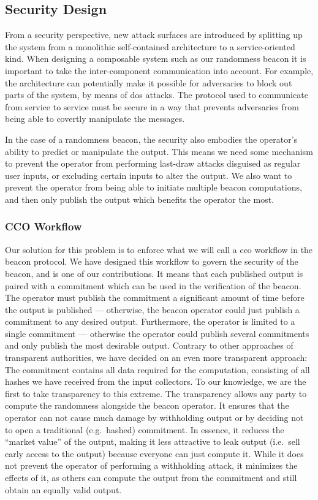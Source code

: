 \subsection{Security Design}%
\label{sub:security_design}

From a security perspective, new attack surfaces are introduced by splitting up the system from a monolithic self-contained architecture to a service-oriented kind.
When designing a composable system such as our randomness beacon it is important to take the inter-component communication into account.
For example, the architecture can potentially make it possible for adversaries to block out parts of the system, by means of \gls{dos} attacks.
The protocol used to communicate from service to service must be secure in a way that prevents adversaries from being able to covertly manipulate the messages.

In the case of a randomness beacon, the security also embodies the operator's ability to predict or manipulate the output.
This means we need some mechanism to prevent the operator from performing last-draw attacks disguised as regular user inputs, or excluding certain inputs to alter the output.
We also want to prevent the operator from being able to initiate multiple beacon computations, and then only publish the output which benefits the operator the most.

\subsubsection{CCO Workflow}
Our solution for this problem is to enforce what we will call a \gls{cco} workflow in the beacon protocol.
We have designed this workflow to govern the security of the beacon, and is one of our contributions.
It means that each published output is paired with a commitment which can be used in the verification of the beacon.
The operator must publish the commitment a significant amount of time before the output is published --- otherwise, the beacon operator could just publish a commitment to any desired output.
Furthermore, the operator is limited to a single commitment --- otherwise the operator could publish several commitments and only publish the most desirable output.
Contrary to other approaches of transparent authorities, we have decided on an even more transparent approach: The commitment contains all data required for the computation, consisting of all hashes we have received from the input collectors.
To our knowledge, we are the first to take transparency to this extreme.
The transparency allows any party to compute the randomness alongside the beacon operator.
It ensures that the operator can not cause much damage by withholding output or by deciding not to open a traditional (e.g.\ hashed) commitment.
In essence, it reduces the \enquote{market value} of the output, making it less attractive to leak output (i.e.\ sell early access to the output) because everyone can just compute it.
While it does not prevent the operator of performing a withholding attack, it minimizes the effects of it, as others can compute the output from the commitment and still obtain an equally valid output.

